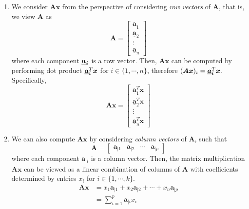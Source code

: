 \begin{enumerate}[label=\theenumi)]
    \item We consider $\bm{Ax}$ from the perspective of considering \emph{row vectors} of $\bm{A}$, that is, we view $\bm{A}$ as
            \begin{equation}
                 \bm{A}=\begin{bmatrix}
                 \bm{\underline{a}}_{1}\\
                 \bm{\underline{a}}_{2}\\
                 \vdots\\
                 \bm{\underline{a}}_{n}
                \end{bmatrix}
            \end{equation}
        where each component $\bm{\underline{a}_{i}}$ is a row vector. Then, $\bm{Ax}$ can be computed by performing dot product $\bm{\underline{a}_i}^T\bm{x}$ for $i\in\{1,\cdots,n\}$, therefore $(\bm{Ax})_{i}=\bm{\underline{a}_i}^T\bm{x}$. Specifically,
         \begin{equation}\label{eq:malg:mvr}
                 \bm{Ax}=\begin{bmatrix}
                 \bm{\underline{a}}_{1}^T\bm{x}\\
                 \bm{\underline{a}}_{2}^T\bm{x}\\
                 \vdots\\
                 \bm{\underline{a}}_{n}^T\bm{x}
                \end{bmatrix}
            \end{equation}
    \item We can also compute $\bm{Ax}$ by considering \emph{column vectors} of $\bm{A}$, such that 
            \begin{equation}
                 \bm{A}=\begin{bmatrix}
                 \bm{a}_{|1} & \bm{a}_{|2} & \cdots & \bm{a}_{|p}
                \end{bmatrix}
            \end{equation}
    where each component $\bm{a}_{|i}$ is a column vector.  Then, the matrix multiplication $\bm{Ax}$ can be viewed as a linear combination of columns of $\bm{A}$ with coefficients determined by entries $x_{i}$ for $i\in\{1,\cdots,k\}$.
        \begin{equation}
            \begin{aligned}
                \bm{Ax} &= x_{1}\bm{a}_{|1} + x_{2}\bm{a}_{|2} + \cdots + x_{n}\bm{a}_{|p}\\
                          &= \sum_{i=1}^p \bm{a}_{|i}x_{i}
            \end{aligned}
        \end{equation}
\end{enumerate}

